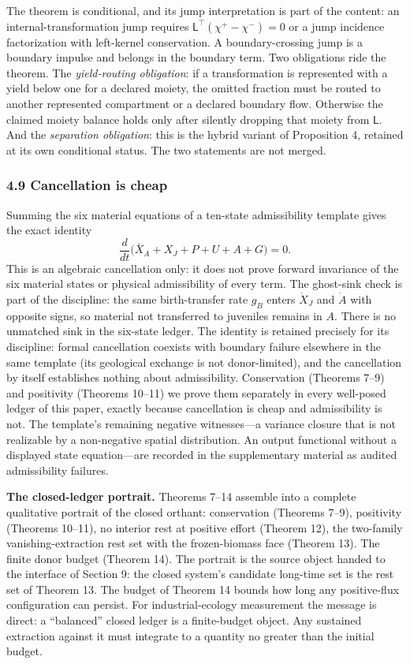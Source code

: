 \documentclass[11pt]{article}
\begin{document}
The theorem is conditional, and its jump interpretation is part of the content: an internal-transformation jump requires \(\mathsf{L}^\top(\chi^+ - \chi^-) = 0\) or a jump incidence factorization with left-kernel conservation. A boundary-crossing jump is a boundary impulse and belongs in the boundary term. Two obligations ride the theorem. The \emph{yield-routing obligation}: if a transformation is represented with a yield below one for a declared moiety, the omitted fraction must be routed to another represented compartment or a declared boundary flow. Otherwise the claimed moiety balance holds only after silently dropping that moiety from \(\mathsf{L}\). And the \emph{separation obligation}: this is the hybrid variant of Proposition 4, retained at its own conditional status. The two statements are not merged.

\subsubsection{4.9 Cancellation is cheap}\label{cancellation-is-cheap}

Summing the six material equations of a ten-state admissibility template gives the exact identity \[\frac{d}{dt}\bigl( \bar X_A + X_J + P + U + A + G \bigr) = 0.\] This is an algebraic cancellation only: it does not prove forward invariance of the six material states or physical admissibility of every term. The ghost-sink check is part of the discipline: the same birth-transfer rate \(g_B\) enters \(\dot X_J\) and \(\dot A\) with opposite signs, so material not transferred to juveniles remains in \(A\). There is no unmatched sink in the six-state ledger. The identity is retained precisely for its discipline: formal cancellation coexists with boundary failure elsewhere in the same template (its geological exchange is not donor-limited), and the cancellation by itself establishes nothing about admissibility. Conservation (Theorems 7--9) and positivity (Theorems 10--11) we prove them separately in every well-posed ledger of this paper, exactly because cancellation is cheap and admissibility is not. The template's remaining negative witnesses---a variance closure that is not realizable by a non-negative spatial distribution. An output functional without a displayed state equation---are recorded in the supplementary material as audited admissibility failures.

\textbf{The closed-ledger portrait.} Theorems 7--14 assemble into a complete qualitative portrait of the closed orthant: conservation (Theorems 7--9), positivity (Theorems 10--11), no interior rest at positive effort (Theorem 12), the two-family vanishing-extraction rest set with the frozen-biomass face (Theorem 13). The finite donor budget (Theorem 14). The portrait is the source object handed to the interface of Section 9: the closed system's candidate long-time set is the rest set of Theorem 13. The budget of Theorem 14 bounds how long any positive-flux configuration can persist. For industrial-ecology measurement the message is direct: a ``balanced'' closed ledger is a finite-budget object. Any sustained extraction against it must integrate to a quantity no greater than the initial budget.
\end{document}
